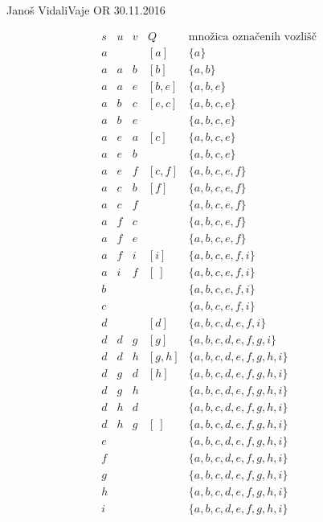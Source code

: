 \begin{naloga}{Janoš Vidali}{Vaje OR 30.11.2016}
\begin{odgovor}
\begin{tabela}
$$
\begin{array}{c|c|c|c|c}
s & u & v & Q & \text{množica označenih vozlišč} \\ \hline
a &   &   & [a]  & \{a\} \\
a & a & b & [b] & \{a, b\} \\
a & a & e & [b, e] & \{a, b, e\} \\
a & b & c & [e, c] & \{a, b, c, e\} \\
a & b  & e &  & \{a, b, c, e\} \\
a & e & a & [c] & \{a, b, c, e\} \\
a & e & b &  & \{a, b, c, e\} \\
a & e & f & [c, f] & \{a, b, c, e, f\} \\
a & c  & b & [f] &  \{a, b, c, e, f\} \\
a & c & f &  &  \{a, b, c, e, f\} \\
a & f & c &  &  \{a, b, c, e, f\} \\
a & f  & e &  &  \{a, b, c, e, f\} \\
a & f & i & [i] &  \{a, b, c, e, f, i\} \\
a & i  & f & [\ ] &  \{a, b, c, e, f, i\} \\
b & & & &  \{a, b, c, e, f, i\} \\
c & & & &  \{a, b, c, e, f, i\} \\
d & & & [d] &  \{a, b, c, d, e, f, i\} \\
d &d &g &[g] &  \{a, b, c, d, e, f, g, i\} \\
d &d &h &[g, h] &  \{a, b, c, d, e, f, g, h, i\} \\
d &g &d &[h] &  \{a, b, c, d, e, f, g, h, i\} \\
d &g &h & &  \{a, b, c, d, e, f, g, h, i\} \\
d &h &d & &  \{a, b, c, d, e, f, g, h, i\} \\
d &h &g &  [\ ]&  \{a, b, c, d, e, f, g, h, i\} \\
e & & & &  \{a, b, c, d, e, f, g, h, i\} \\
f & & & &  \{a, b, c, d, e, f, g, h, i\} \\
g & & & &  \{a, b, c, d, e, f, g, h, i\} \\
h & & & &  \{a, b, c, d, e, f, g, h, i\} \\
i & & & &  \{a, b, c, d, e, f, g, h, i\}
\end{array}
$$
\end{tabela}

\begin{slika}
\end{slika}

\end{odgovor}
\end{naloga}
